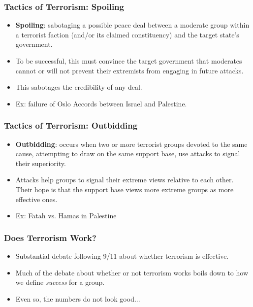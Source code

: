 \documentclass{beamer}
\begin{document}
\begin{frame} 
	\frametitle{\LARGE{Tactics of Terrorism: Spoiling}}
	\begin{itemize}
		\item \textbf{Spoiling}: sabotaging a possible peace deal between a moderate group within a terrorist faction (and/or its claimed constituency) and the target state's government. \pause 
		
		\item To be successful, this must convince the target government that moderates cannot or will not prevent their extremists from engaging in future attacks. \pause
		\item This sabotages the credibility of any deal.
		\item Ex: failure of Oslo Accords between Israel and Palestine.
	\end{itemize}
\end{frame}

\begin{frame} 
	\frametitle{\LARGE{Tactics of Terrorism: Outbidding}}
	\begin{itemize}
		\item \textbf{Outbidding}: occurs when two or more terrorist groups devoted to the same cause, attempting to draw on the same support base, use attacks to signal their superiority. \pause
		\item Attacks help groups to signal their extreme views relative to each other. Their hope is that the support base views more extreme groups as more effective ones.
		\item Ex: Fatah vs. Hamas in Palestine
		
	\end{itemize}
\end{frame}




\begin{frame} 
\frametitle{\LARGE{Does Terrorism Work?}}
\begin{itemize}
		\item Substantial debate following 9/11 about whether terrorism is effective. \pause 
		\item Much of the debate about whether or not terrorism works boils down to how we define \emph{success} for a group. \pause 
		\item Even so, the numbers do not look good...
\end{itemize}
\end{frame}
\end{document}
